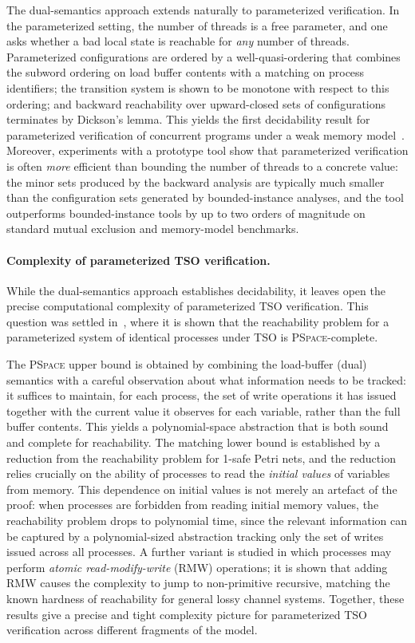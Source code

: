 The dual-semantics approach extends naturally to parameterized verification.
In the parameterized setting, the number of threads is a free parameter, and
one asks whether a bad local state is reachable for \emph{any} number of
threads. Parameterized configurations are ordered by a well-quasi-ordering
that combines the subword ordering on load buffer contents with a matching
on process identifiers; the transition system is shown to be monotone with
respect to this ordering; and backward reachability over upward-closed sets
of configurations terminates by Dickson's lemma. This yields the first
decidability result for parameterized verification of concurrent programs
under a weak memory model~\cite{AABN16,AABN_journal}. Moreover, experiments
with a prototype tool show that parameterized verification is often
\emph{more} efficient than bounding the number of threads to a concrete
value: the minor sets produced by the backward analysis are typically much
smaller than the configuration sets generated by bounded-instance analyses,
and the tool outperforms bounded-instance tools by up to two orders of
magnitude on standard mutual exclusion and memory-model benchmarks.

\paragraph{Complexity of parameterized TSO verification.}
While the dual-semantics approach establishes decidability, it leaves open
the precise computational complexity of parameterized TSO verification. This
question was settled in~\cite{AAR20}, where it is shown that the reachability
problem for a parameterized system of identical processes under TSO is
\textsc{PSpace}-complete.

The \textsc{PSpace} upper bound is obtained by combining the load-buffer
(dual) semantics with a careful observation about what information needs to
be tracked: it suffices to maintain, for each process, the set of write
operations it has issued together with the current value it observes for each
variable, rather than the full buffer contents. This yields a polynomial-space
abstraction that is both sound and complete for reachability. The matching
lower bound is established by a reduction from the reachability problem for
1-safe Petri nets, and the reduction relies crucially on the ability of
processes to read the \emph{initial values} of variables from memory. This
dependence on initial values is not merely an artefact of the proof: when
processes are forbidden from reading initial memory values, the reachability
problem drops to polynomial time, since the relevant information can be
captured by a polynomial-sized abstraction tracking only the set of writes
issued across all processes. A further variant is studied in which processes
may perform \emph{atomic read-modify-write} (RMW) operations; it is shown
that adding RMW causes the complexity to jump to non-primitive recursive,
matching the known hardness of reachability for general lossy channel systems.
Together, these results give a precise and tight complexity picture for
parameterized TSO verification across different fragments of the model.

